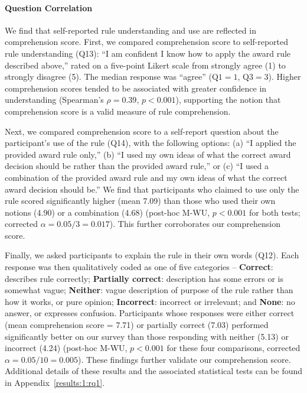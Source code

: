 \documentclass{article}
\newcommand{\Appref}[1]{Appendix~\ref{#1}}
\begin{document}
\paragraph{Question Correlation}

We find that self-reported rule understanding and use are reflected in comprehension score. First, we compared comprehension score to self-reported rule understanding (Q13): ``I am confident I know how to apply the award rule described above,'' rated on a five-point Likert scale from strongly agree (1) to strongly disagree (5). The median response was ``agree'' ($\text{Q1}=1$, $\text{Q3}=3$). Higher comprehension scores tended to be associated with greater confidence in understanding (Spearman's $\rho = 0.39$, $p<0.001$), supporting the notion that  comprehension score is a valid measure of rule comprehension.

Next, we compared comprehension score to a self-report question about the participant's use of the rule (Q14), with the following options: (a) ``I applied the provided award rule only,'' (b) ``I used my own ideas of what the correct award decision should be rather than the provided award rule,'' or (c) ``I used a combination of the provided award rule and my own ideas of what the correct award decision should be.'' We find that participants who claimed to use only the rule scored significantly higher (mean 7.09) than those who used their own notions (4.90) or a combination (4.68) (post-hoc M-WU,
$p<0.001$ for both tests; corrected $\alpha = 0.05/3 = 0.017$). This further corroborates our comprehension score.

Finally, we asked participants to explain the rule in their own words (Q12). Each response was then qualitatively coded as one of five categories -- \textbf{Correct}: describes rule correctly; \textbf{Partially correct}: description has some errors or is somewhat vague; \textbf{Neither}: vague description of purpose of the rule rather than how it works, or pure opinion; \textbf{Incorrect}: incorrect or irrelevant; and \textbf{None}: no answer, or expresses confusion. Participants whose responses were either correct (mean comprehension score = 7.71) or partially correct (7.03) performed significantly better on our survey than those responding with neither (5.13) or incorrect (4.24) (post-hoc M-WU, $p<0.001$ for these four comparisons, corrected $\alpha = 0.05/10 = 0.005$). These findings further validate our comprehension score. Additional details of these results and the associated statistical tests can be found in \Appref{results:1:rq1}.
\end{document}
